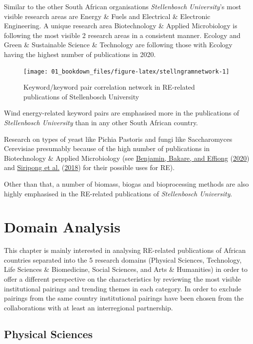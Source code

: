 \documentclass[
]{book}
\begin{document}
Similar to the other South African organisations \emph{Stellenbosch University}'s most visible research areas are Energy \& Fuels and Electrical \& Electronic Engineering. A unique research area Biotechnology \& Applied Microbiology is following the most visible 2 research areas in a consistent manner. Ecology and Green \& Sustainable Science \& Technology are following those with Ecology having the highest number of publications in 2020.

\begin{figure}
\texttt{[image: 01\_bookdown\_files/figure-latex/stellngramnetwork-1]} \caption{Keyword/keyword pair correlation network in RE-related publications of Stellenbosch University }\label{fig:stellngramnetwork}
\end{figure}

Wind energy-related keyword pairs are emphasised more in the publications of \emph{Stellenbosch University} than in any other South African country.

Research on types of yeast like Pichia Pastoris and fungi like Saccharomyces Cerevisiae presumably because of the high number of publications in Biotechnology \& Applied Microbiology (see \protect\hyperlink{ref-benjamin2020}{Benjamin, Bakare, and Effiong} (\protect\hyperlink{ref-benjamin2020}{2020}) and \protect\hyperlink{ref-siripong2018}{Siripong et al.} (\protect\hyperlink{ref-siripong2018}{2018}) for their possible uses for RE).

Other than that, a number of biomass, biogas and bioprocessing methods are also highly emphasised in the RE-related publications of \emph{Stellenbosch University}.

\hypertarget{domain-analysis}{%
\section{Domain Analysis}\label{domain-analysis}}

This chapter is mainly interested in analysing RE-related publications of African countries separated into the 5 research domains (Physical Sciences, Technology, Life Sciences \& Biomedicine, Social Sciences, and Arts \& Humanities) in order to offer a different perspective on the characteristics by reviewing the most visible institutional pairings and trending themes in each category. In order to exclude pairings from the same country institutional pairings have been chosen from the collaborations with at least an interregional partnership.

\hypertarget{physical-sciences}{%
\subsection{Physical Sciences}\label{physical-sciences}}
\end{document}
